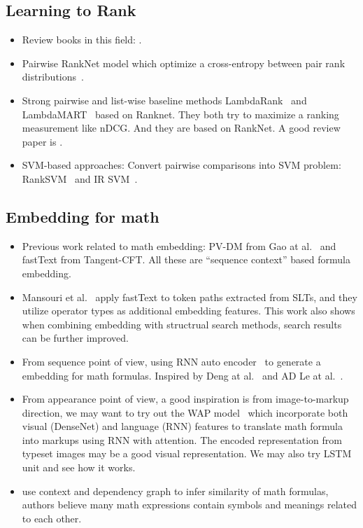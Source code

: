 \documentclass[11pt]{artikel3}
\begin{document}
\subsection{Learning to Rank}
\begin{itemize}
\item Review books in this field: \cite{liu2009learning, li2011learning}.
\item Pairwise RankNet model which optimize a cross-entropy between pair rank distributions~\cite{burges2005learning}.
\item Strong pairwise and list-wise baseline methods LambdaRank~\cite{burges2007learning} and LambdaMART~\cite{wu2008ranking} based on Ranknet. They both try to maximize a ranking measurement like nDCG. And they are based on RankNet. A good review paper is \cite{burges2010ranknet}.
\item SVM-based approaches: Convert pairwise comparisons into SVM problem: RankSVM~\cite{joachims2002optimizing} and IR SVM~\cite{cao2006adapting}.
\end{itemize}

\subsection{Embedding for math}
\begin{itemize}
\item Previous work related to math embedding: PV-DM from Gao at al.~\cite{gao2017preliminary} and fastText from Tangent-CFT. All these are ``sequence context'' based formula embedding.
\item Mansouri et al.~\cite{BehroozICTIR2019} apply fastText to token paths extracted from SLTs, and they utilize operator types as additional embedding features. This work also shows when combining embedding with structrual search methods, search results can be further improved.
\item From sequence point of view, using RNN auto encoder~\cite{mikolov2012statistical, sutskever2014sequence, bahdanau2014neural} to generate a embedding for math formulas. Inspired by Deng at al.~\cite{deng2017image} and AD Le at al.~\cite{le2017training}.
\item From appearance point of view, a good inspiration is from image-to-markup direction, we may want to try out the WAP model~\cite{zhang2017gru, zhang2017watch, zhang2018track} which incorporate both visual (DenseNet) and language (RNN) features to translate math formula into markups using RNN with attention. The encoded representation from typeset images may be a good visual representation. We may also try LSTM unit and see how it works.
\item \cite{kristianto2017utilizing} use context and dependency graph to infer similarity of math formulas, authors believe many math expressions contain symbols and meanings related to each other.
\end{itemize}
\end{document}

